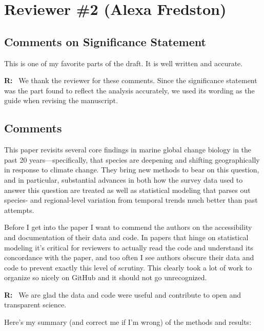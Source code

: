 \documentclass[11pt]{article}
\newcommand{\reviewer}[1]{\par\medskip\noindent\textcolor{revcolor}{#1}\par}
\newenvironment{reply}
{\par\smallskip\begingroup\color{replycolor}\noindent\textbf{R:}\ }
{\endgroup\par\medskip}
\begin{document}
\section*{Reviewer \#2 (Alexa Fredston)}

\subsection*{Comments on Significance Statement}
\reviewer{This is one of my favorite parts of the draft. It is well written and accurate.}

\begin{reply}
    We thank the reviewer for these comments. Since the significance statement was the part found to reflect the analysis accurately, we used its wording as the guide when revising the manuscript.
\end{reply}

\subsection*{Comments}

\reviewer{This paper revisits several core findings in marine global change biology in the past 20 years---specifically, that species are deepening and shifting geographically in response to climate change. They bring new methods to bear on this question, and in particular, substantial advances in both how the survey data used to answer this question are treated as well as statistical modeling that parses out species- and regional-level variation from temporal trends much better
than past attempts.}

\reviewer{Before I get into the paper I want to commend the authors on the accessibility and documentation of their data and code. In papers that hinge on statistical modeling it's critical for reviewers to actually read the code and understand its concordance with the paper, and too often I see authors obscure their data and code to prevent exactly this level of scrutiny. This clearly took a lot of work to organize so nicely on GitHub and it should not go unrecognized.}

\begin{reply}
    We are glad the data and code were useful and contribute to open and transparent science.
\end{reply}

\reviewer{Here's my summary (and correct me if I'm wrong) of the methods and results:}
\end{document}
